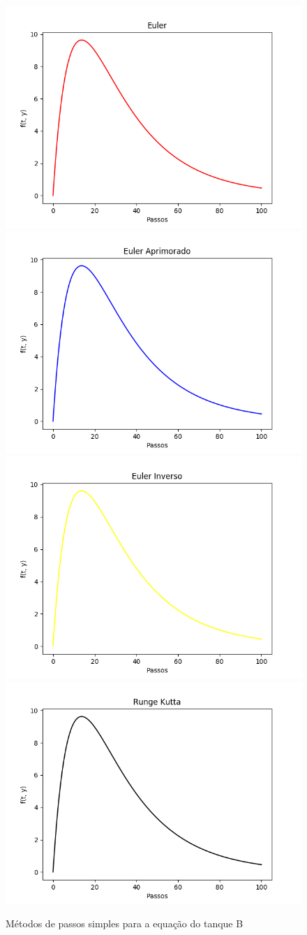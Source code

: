 \documentclass[12pt]{article}%
\begin{document}
    \begin{figure}[H]
        \begin{center}
            \includegraphics[width=.4\textwidth]{problemas/metodos_q1/tanque_b_euler.png}
            \includegraphics[width=.4\textwidth]{problemas/metodos_q1/tanque_b_euler_aprimorado.png}
            \includegraphics[width=.4\textwidth]{problemas/metodos_q1/tanque_b_euler_inverso.png}
            \includegraphics[width=.4\textwidth]{problemas/metodos_q1/tanque_b_runge_kutta.png}
        \end{center}
        \caption{Métodos de passos simples para a equação do tanque B}
    \end{figure}
    
\end{document}
